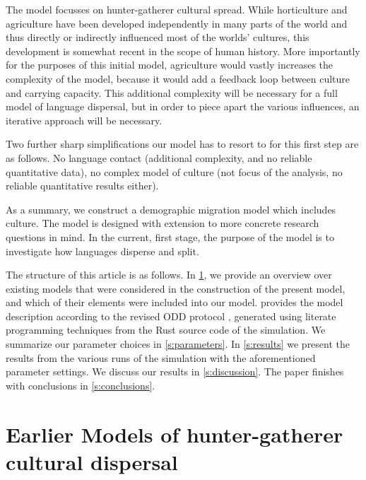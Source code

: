 \documentclass[a4paper,12pt]{scrartcl}
\begin{document}
The model focusses on hunter-gatherer cultural spread. While horticulture and
agriculture have been developed independently in many parts of the world
\parencite{} and thus directly or indirectly influenced most of the worlds'
cultures, this development is somewhat recent in the scope of human history.
More importantly for the purposes of this initial model, agriculture would
vastly increases the complexity of the model, because it would add a feedback
loop between culture and carrying capacity. This additional complexity will be
necessary for a full model of language dispersal, but in order to piece apart
the various influences, an iterative approach will be necessary.

Two further sharp simplifications our model has to resort to for this first step
are as follows. No language contact (additional complexity, and no reliable
quantitative data), no complex model of culture (not focus of the analysis, no
reliable quantitative results either).

As a summary, we construct a demographic migration model which includes culture.
The model is designed with extension to more concrete research questions in
mind. In the current, first stage, the purpose of the model is to investigate
how languages disperse and split.

The structure of this article is as follows. In \cref{s:earlier}, we provide an
overview over existing models that were considered in the construction of the
present model, and which of their elements were included into our model.
 provides the model description according to the revised ODD
protocol \parencite{grimm2006standard,grimm2010odd}, generated using literate
programming techniques \parencite{knuth1984literate} from the Rust \parencite{}
source code of the simulation. We summarize our parameter choices in
\cref{s:parameters}. In \cref{s:results} we present the results from the various
runs of the simulation with the aforementioned parameter settings. We discuss
our results in \cref{s:discussion}. The paper finishes with conclusions in
\cref{s:conclusions}.

\section{Earlier Models of hunter-gatherer cultural dispersal}
\label{s:earlier}
\end{document}
